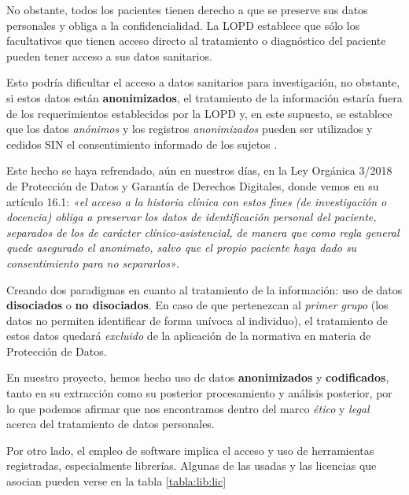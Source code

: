 No obstante, todos los pacientes tienen derecho a que se preserve sus datos personales y obliga a la confidencialidad. La LOPD establece que sólo los facultativos que tienen acceso directo al tratamiento o diagnóstico del paciente pueden tener acceso a sus datos sanitarios.

Esto podría dificultar el acceso a datos sanitarios para investigación, no obstante, si estos datos están \textbf{anonimizados}, el tratamiento de la información estaría fuera de los requerimientos establecidos por la LOPD y, en este supuesto, se establece que los datos \textit{anónimos} y los registros \textit{anonimizados} pueden ser utilizados y cedidos SIN el consentimiento informado de los sujetos \cite{GarridoElustondo2012InvestigacionPrimaria}.

Este hecho se haya refrendado, aún en nuestros días, en la Ley Orgánica 3/2018 de Protección de Datos y Garantía de Derechos Digitales, donde vemos en su artículo 16.1: \textit{«el acceso a la historia clínica con estos fines (de investigación o docencia) obliga a preservar los datos de identificación personal del paciente, separados de los de carácter clínico-asistencial, de manera que como regla general quede asegurado el anonimato, salvo que el propio paciente haya dado su consentimiento para no separarlos»}.

Creando dos paradigmas en cuanto al tratamiento de la información: uso de datos \textbf{disociados} o \textbf{no disociados}. En caso de que pertenezcan al \textit{primer grupo} (los datos no permiten identificar de forma unívoca al individuo), el tratamiento de estos datos quedará \textit{excluido} de la aplicación de la normativa en materia de Protección de Datos.

En nuestro proyecto, hemos hecho uso de datos \textbf{anonimizados} y \textbf{codificados}, tanto en su extracción como su posterior procesamiento y análisis posterior, por lo que podemos afirmar que nos encontramos dentro del marco \textit{ético} y \textit{legal} acerca del tratamiento de datos personales.

Por otro lado, el empleo de software implica el acceso y uso de herramientas registradas, especialmente librerías. Algunas de las usadas y las licencias que asocian pueden verse en la tabla \ref{tabla:lib:lic}


